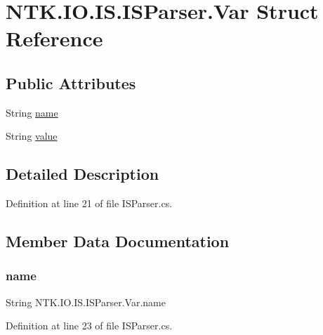 \hypertarget{struct_n_t_k_1_1_i_o_1_1_i_s_1_1_i_s_parser_1_1_var}{}\section{N\+T\+K.\+I\+O.\+I\+S.\+I\+S\+Parser.\+Var Struct Reference}
\label{struct_n_t_k_1_1_i_o_1_1_i_s_1_1_i_s_parser_1_1_var}
\subsection*{Public Attributes}
\begin{DoxyCompactItemize}
\item 
String \mbox{\hyperlink{struct_n_t_k_1_1_i_o_1_1_i_s_1_1_i_s_parser_1_1_var_a80f13bf16215a2bbcc1a421ccaf8f59d}{name}}
\item 
String \mbox{\hyperlink{struct_n_t_k_1_1_i_o_1_1_i_s_1_1_i_s_parser_1_1_var_a11dd3042200cf7b0bc4237bfc55affe3}{value}}
\end{DoxyCompactItemize}


\subsection{Detailed Description}


Definition at line 21 of file I\+S\+Parser.\+cs.



\subsection{Member Data Documentation}
\mbox{\label{struct_n_t_k_1_1_i_o_1_1_i_s_1_1_i_s_parser_1_1_var_a80f13bf16215a2bbcc1a421ccaf8f59d}} 
\subsubsection{\texorpdfstring{name}{name}}
{\footnotesize\ttfamily String N\+T\+K.\+I\+O.\+I\+S.\+I\+S\+Parser.\+Var.\+name}



Definition at line 23 of file I\+S\+Parser.\+cs.

\mbox{\label{struct_n_t_k_1_1_i_o_1_1_i_s_1_1_i_s_parser_1_1_var_a11dd3042200cf7b0bc4237bfc55affe3}} 
